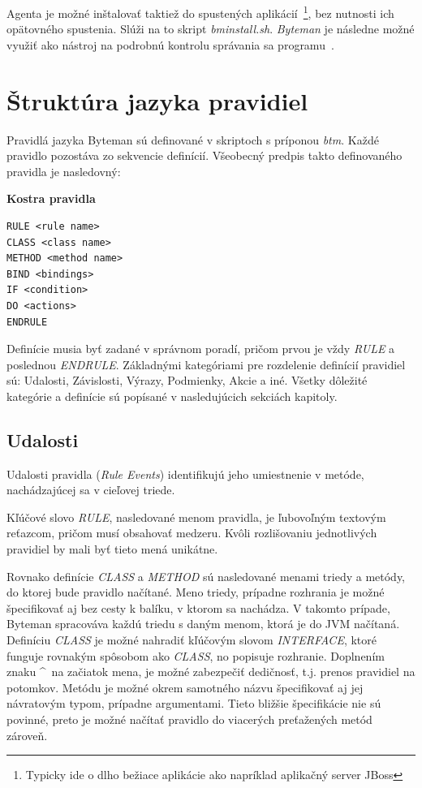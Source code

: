\documentclass[11pt,final,oneside]{fithesis}
\newenvironment{example}[1]
{
\vspace{3mm}
\noindent\textbf{#1}
\vspace{2mm}
}
{
\vspace{3mm}
}
\begin{document}
Agenta je možné inštalovať taktiež do spustených aplikácií~\footnote{Typicky
ide o dlho bežiace aplikácie ako napríklad aplikačný server JBoss}, bez 
nutnosti ich opätovného spustenia. Slúži na to skript \textit{bminstall.sh}.
\textit{Byteman} je následne možné využiť ako nástroj na podrobnú kontrolu 
správania sa 
programu~\cite{RedHat:Byteman}. 

\section{Štruktúra jazyka pravidiel}
Pravidlá jazyka Byteman sú definované v skriptoch s príponou \textit{btm}.
Každé pravidlo pozostáva zo sekvencie definícií. Všeobecný predpis takto
definovaného pravidla je nasledovný:

\begin{example}{Kostra pravidla}
\begin{verbatim}
RULE <rule name>
CLASS <class name>
METHOD <method name>
BIND <bindings>
IF <condition>
DO <actions>
ENDRULE
\end{verbatim}
\end{example}

Definície musia byť zadané v správnom poradí, pričom prvou je vždy
\textit{RULE} a poslednou \textit{ENDRULE}. Základnými kategóriami pre
rozdelenie definícií pravidiel sú: Udalosti, Závislosti, Výrazy, Podmienky,
Akcie a iné. Všetky dôležité kategórie a definície sú popísané v nasledujúcich
sekciách kapitoly.

\subsection{Udalosti}
Udalosti pravidla (\textit{Rule Events}) identifikujú jeho umiestnenie v
metóde, nachádzajúcej sa v cieľovej triede.

Kľúčové slovo \textit{RULE}, nasledované menom pravidla, je ľubovoľným 
textovým reťazcom, pričom musí obsahovať medzeru. Kvôli rozlišovaniu 
jednotlivých pravidiel by mali byť tieto mená unikátne.

Rovnako definície \textit{CLASS} a \textit{METHOD} sú nasledované menami 
triedy a metódy, do ktorej bude pravidlo načítané. Meno triedy, prípadne 
rozhrania je možné špecifikovať aj bez cesty k balíku, v ktorom sa nachádza. V 
takomto prípade, Byteman spracováva každú triedu s daným menom, ktorá je do 
JVM načítaná. Definíciu \textit{CLASS} je možné nahradiť kľúčovým slovom
\textit{INTERFACE}, ktoré funguje rovnakým spôsobom ako \textit{CLASS}, no 
popisuje rozhranie. Doplnením znaku \^~na začiatok mena, je možné zabezpečiť 
dedičnosť, t.j. prenos pravidiel na potomkov.
Metódu je možné okrem samotného názvu špecifikovať aj jej návratovým typom, 
prípadne argumentami. Tieto bližšie špecifikácie nie sú povinné, preto je 
možné načítať pravidlo do viacerých preťažených metód zároveň.
\end{document}
